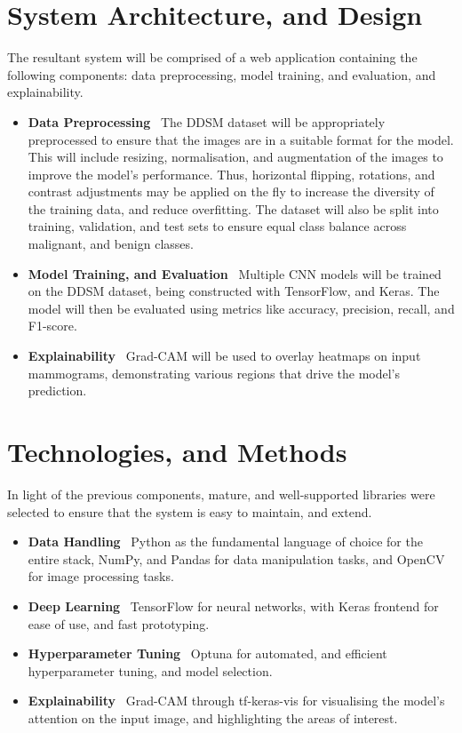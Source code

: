 \documentclass[../main]{subfiles}
\begin{document}
\section{System Architecture, and Design}
The resultant system will be comprised of a web application containing the following components: data preprocessing, model training, and evaluation, and explainability.

\begin{itemize}
	\item \textbf{Data Preprocessing} \textemdash\ The DDSM dataset will be appropriately preprocessed to ensure that the images are in a suitable format for the model. This will include resizing, normalisation, and augmentation of the images to improve the model's performance. Thus, horizontal flipping, rotations, and contrast adjustments may be applied on the fly to increase the diversity of the training data, and reduce overfitting. The dataset will also be split into training, validation, and test sets to ensure equal class balance across malignant, and benign classes.
	\item \textbf{Model Training, and Evaluation} \textemdash\ Multiple CNN models will be trained on the DDSM dataset, being constructed with TensorFlow, and Keras. The model will then be evaluated using metrics like accuracy, precision, recall, and F1-score.
	\item \textbf{Explainability} \textemdash\ Grad-CAM will be used to overlay heatmaps on input mammograms, demonstrating various regions that drive the model's prediction.
\end{itemize}

\section{Technologies, and Methods}
In light of the previous components, mature, and well-supported libraries were selected to ensure that the system is easy to maintain, and extend.

\begin{itemize}
	\item \textbf{Data Handling} \textemdash\ Python as the fundamental language of choice for the entire stack, NumPy, and Pandas for data manipulation tasks, and OpenCV for image processing tasks.
	\item \textbf{Deep Learning} \textemdash\ TensorFlow for neural networks, with Keras frontend for ease of use, and fast prototyping.
	\item \textbf{Hyperparameter Tuning} \textemdash\ Optuna for automated, and efficient hyperparameter tuning, and model selection.
	\item \textbf{Explainability} \textemdash\ Grad-CAM through tf-keras-vis for visualising the model's attention on the input image, and highlighting the areas of interest.
\end{itemize}
\end{document}
